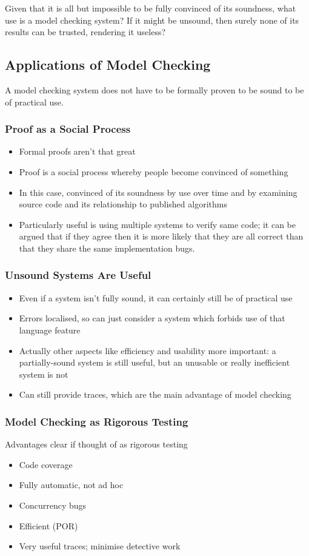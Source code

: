 \documentclass[12pt,a4paper,twoside,openright]{report}
\begin{document}
Given that it is all but impossible to
be fully convinced of its soundness,
what use is a model checking
system? If it might be unsound, then surely
none of its results can be trusted,
rendering it useless?

\subsection{Applications of Model Checking}
A model checking system does not have to be
formally proven to be sound to be of practical use.

\subsubsection{Proof as a Social Process}
\begin{itemize}
	\item Formal proofs aren't that great
	\item Proof is a social process whereby
	people become convinced of something
	\item In this case, convinced of its
	soundness by use over time and by
	examining source code and its
	relationship to published algorithms
	\item Particularly useful is using
	multiple systems to verify same code;
	it can be argued that if they agree
	then it is more likely that they are
	all correct than that they share the
	same implementation bugs.
\end{itemize}
\subsubsection{Unsound Systems Are Useful}
\begin{itemize}
	\item Even if a system isn't fully sound,
	it can certainly still be of practical use
	\item Errors localised, so can just consider
	a system which forbids use of that language
	feature
	\item Actually other aspects like efficiency
	and usability more important: a partially-sound
	system is still useful, but an unusable or
	really inefficient system is not
	\item Can still provide traces, which are
	the main advantage of model checking
\end{itemize}
\subsubsection{Model Checking as Rigorous Testing}
Advantages clear if thought of as rigorous
testing
\begin{itemize}
	\item Code coverage
	\item Fully automatic, not ad hoc
	\item Concurrency bugs
	\item Efficient (POR)
	\item Very useful traces; minimise detective work
\end{itemize}
\end{document}
